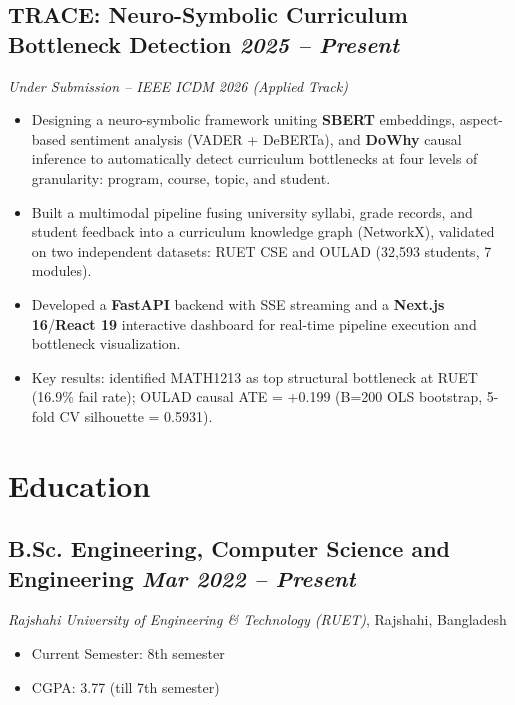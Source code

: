 \documentclass[10pt, a4paper]{article}
\newcommand{\datedsubsection}[2]{%
  \subsection*{#1 \hfill \small\textit{#2}}%
}
\newcommand{\resitem}[1]{\item #1} %
\begin{document}
\datedsubsection{TRACE: Neuro-Symbolic Curriculum Bottleneck Detection}{2025 -- Present}
\textit{Under Submission -- IEEE ICDM 2026 (Applied Track)}
\begin{itemize}
    \resitem{Designing a neuro-symbolic framework uniting \textbf{SBERT} embeddings, aspect-based sentiment analysis (VADER + DeBERTa), and \textbf{DoWhy} causal inference to automatically detect curriculum bottlenecks at four levels of granularity: program, course, topic, and student.}
    \resitem{Built a multimodal pipeline fusing university syllabi, grade records, and student feedback into a curriculum knowledge graph (NetworkX), validated on two independent datasets: RUET CSE and OULAD (32,593 students, 7 modules).}
    \resitem{Developed a \textbf{FastAPI} backend with SSE streaming and a \textbf{Next.js 16}/\textbf{React 19} interactive dashboard for real-time pipeline execution and bottleneck visualization.}
    \resitem{Key results: identified MATH1213 as top structural bottleneck at RUET (16.9\% fail rate); OULAD causal ATE = +0.199 (B=200 OLS bootstrap, 5-fold CV silhouette = 0.5931).}
\end{itemize}

\section{Education}

\datedsubsection{B.Sc. Engineering, Computer Science and Engineering}{Mar 2022 -- Present}
\textit{Rajshahi University of Engineering \& Technology (RUET)}, Rajshahi, Bangladesh
\begin{itemize}
    \resitem{Current Semester: 8th semester}
    \resitem{CGPA: 3.77 (till 7th semester)}
\end{itemize}

\end{document}
